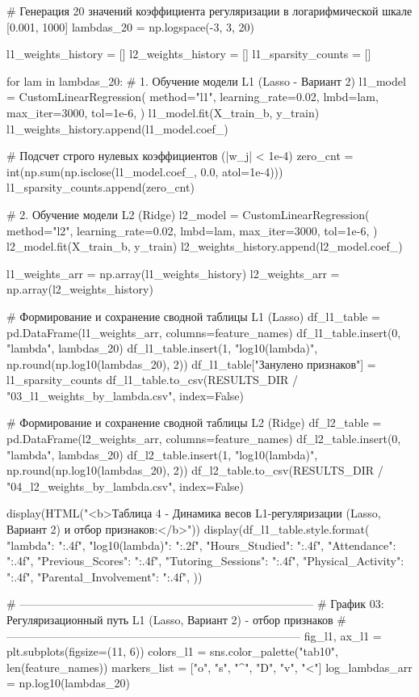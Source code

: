 \documentclass[14pt,a4paper]{extarticle}
\begin{document}
\begin{CodeListing}
# Генерация 20 значений коэффициента регуляризации в логарифмической шкале [0.001, 1000]
lambdas_20 = np.logspace(-3, 3, 20)

l1_weights_history = []
l2_weights_history = []
l1_sparsity_counts = []

for lam in lambdas_20:
    # 1. Обучение модели L1 (Lasso - Вариант 2)
    l1_model = CustomLinearRegression(
        method="l1",
        learning_rate=0.02,
        lmbd=lam,
        max_iter=3000,
        tol=1e-6,
    )
    l1_model.fit(X_train_b, y_train)
    l1_weights_history.append(l1_model.coef_)

    # Подсчет строго нулевых коэффициентов (|w_j| < 1e-4)
    zero_cnt = int(np.sum(np.isclose(l1_model.coef_, 0.0, atol=1e-4)))
    l1_sparsity_counts.append(zero_cnt)

    # 2. Обучение модели L2 (Ridge)
    l2_model = CustomLinearRegression(
        method="l2",
        learning_rate=0.02,
        lmbd=lam,
        max_iter=3000,
        tol=1e-6,
    )
    l2_model.fit(X_train_b, y_train)
    l2_weights_history.append(l2_model.coef_)

l1_weights_arr = np.array(l1_weights_history)
l2_weights_arr = np.array(l2_weights_history)

# Формирование и сохранение сводной таблицы L1 (Lasso)
df_l1_table = pd.DataFrame(l1_weights_arr, columns=feature_names)
df_l1_table.insert(0, "lambda", lambdas_20)
df_l1_table.insert(1, "log10(lambda)", np.round(np.log10(lambdas_20), 2))
df_l1_table["Занулено признаков"] = l1_sparsity_counts
df_l1_table.to_csv(RESULTS_DIR / "03_l1_weights_by_lambda.csv", index=False)

# Формирование и сохранение сводной таблицы L2 (Ridge)
df_l2_table = pd.DataFrame(l2_weights_arr, columns=feature_names)
df_l2_table.insert(0, "lambda", lambdas_20)
df_l2_table.insert(1, "log10(lambda)", np.round(np.log10(lambdas_20), 2))
df_l2_table.to_csv(RESULTS_DIR / "04_l2_weights_by_lambda.csv", index=False)

display(HTML("<b>Таблица 4 - Динамика весов L1-регуляризации (Lasso, Вариант 2) и отбор признаков:</b>"))
display(df_l1_table.style.format({
    "lambda": "{:.4f}",
    "log10(lambda)": "{:.2f}",
    "Hours_Studied": "{:.4f}",
    "Attendance": "{:.4f}",
    "Previous_Scores": "{:.4f}",
    "Tutoring_Sessions": "{:.4f}",
    "Physical_Activity": "{:.4f}",
    "Parental_Involvement": "{:.4f}",
}))

# ------------------------------------------------------------------------------
# График 03: Регуляризационный путь L1 (Lasso, Вариант 2) - отбор признаков
# ------------------------------------------------------------------------------
fig_l1, ax_l1 = plt.subplots(figsize=(11, 6))
colors_l1 = sns.color_palette("tab10", len(feature_names))
markers_list = ["o", "s", "^", "D", "v", "<"]
log_lambdas_arr = np.log10(lambdas_20)


\end{CodeListing}
\end{document}
